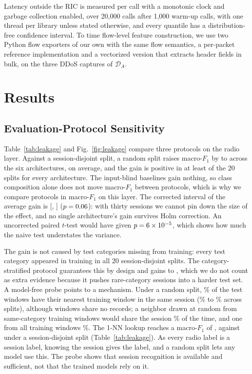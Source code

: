\documentclass{ieeeaccess}
\newcommand{\DA}{\ensuremath{\mathcal{D}_{A}}}
\begin{document}
Latency outside the RIC is measured per call with a monotonic clock and garbage collection enabled, over 20,000 calls after 1,000 warm-up calls, with one thread per library unless stated otherwise, and every quantile has a distribution-free confidence interval. To time flow-level feature construction, we use two Python flow exporters of our own with the same flow semantics, a per-packet reference implementation and a vectorized version that extracts header fields in bulk, on the three DDoS captures of \DA{}.

\section{Results}
\label{sec:results}

\subsection{Evaluation-Protocol Sensitivity}
\label{sec:res:protocol}

Table~\ref{tab:leakage} and Fig.~\ref{fig:leakage} compare three protocols on the radio layer. Against a session-disjoint split, a random split raises macro-$F_1$ by \LeakMin{} to \LeakMax{} across the six architectures, \LeakAvg{} on average, and the gain is positive in at least \LeakSeedsMin{} of the 20 splits for every architecture. The input-blind baselines gain nothing, so class composition alone does not move macro-$F_1$ between protocols, which is why we compare protocols in macro-$F_1$ on this layer. The corrected interval of the average gain is [\LeakAvgNbLo, \LeakAvgNbHi] ($p = 0.06$): with thirty sessions we cannot pin down the size of the effect, and no single architecture's gain survives Holm correction. An uncorrected paired $t$-test would have given $p = 6\times10^{-5}$, which shows how much the naive test understates the variance.

The gain is not caused by test categories missing from training: every test category appeared in training in all 20 session-disjoint splits. The category-stratified protocol guarantees this by design and gains \LeakStratMin{} to \LeakStratMax{}, which we do not count as extra evidence because it pushes rare-category sessions into a harder test set. A model-free probe points to a mechanism. Under a random split, \NNSame\% of the test windows have their nearest training window in the same session (\NNSameMin\% to \NNSameMax\% across splits), although windows share no records; a neighbor drawn at random from same-category training windows would share the session \NNChanceCat\% of the time, and one from all training windows \NNChanceAny\%. The 1-NN lookup reaches a macro-$F_1$ of \NNoneRandom{}, against \NNoneRun{} under a session-disjoint split (Table~\ref{tab:leakage}). As every radio label is a session label, knowing the session gives the label, and a random split lets any model use this. The probe shows that session recognition is available and sufficient, not that the trained models rely on it.
\end{document}
